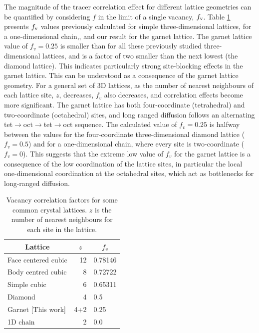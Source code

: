 \documentclass[aps,prb,twocolumn,superscriptaddress,reprint]{revtex4-1}
\begin{document}
The magnitude of the tracer correlation effect for different lattice geometries can be quantified by considering $f$ in the limit of a single vacancy, $f_{\mathrm{v}}$. 
Table \ref{tab:vacancy_correlation_factors} presents $f_{\mathrm{v}}$ values previously calculated for simple three-dimensional lattices,\cite{CompaanAndHaven_TransFaradaySoc1956} for a one-dimensional chain,\cite{Mehrer_DiffusionBook}, and our result for the garnet lattice. 
The garnet lattice value of $f_v=0.25$ is smaller than for all these previously studied three-dimensional lattices, and is a factor of two smaller than the next lowest (the diamond lattice). This indicates particularly strong site-blocking effects in the garnet lattice. 
This can be understood as a consequence of the garnet lattice geometry. 
For a general set of 3D lattices, as the number of nearest neighbours of each lattice site, $z$, decreases, $f_v$ also decreases, and correlation effects become more significant.\cite{Friauf_JApplPhys1962}
The garnet lattice has both four-coordinate (tetrahedral) and two-coordinate (octahedral) sites, and long ranged diffusion follows an alternating tet$\to$oct$\to$tet$\to$oct sequence. 
The calculated value of $f_v=0.25$ is halfway between the values for the four-coordinate three-dimensional diamond lattice ($f_v=0.5$) and for a one-dimensional chain, where every site is two-coordinate ($f_v=0$).\cite{Mehrer_DiffusionBook} 
This suggests that the extreme low value of $f_v$ for the garnet lattice is a consequence of the low coordination of the lattice sites, in particular the local one-dimensional coordination at the octahedral sites, which act as bottlenecks for long-ranged diffusion. 

\begin{table}[htb]
   \begin{center}
     \begin{tabular}{lrl} \hline
        \multicolumn{1}{c}{Lattice} & \multicolumn{1}{c}{$z$} & \multicolumn{1}{c}{$f_v$} \\ \hline
        Face centered cubic\cite{CompaanAndHaven_TransFaradaySoc1956} & 12 & 0.78146 \\
        Body centred cubic\cite{CompaanAndHaven_TransFaradaySoc1956} & 8 & 0.72722 \\
        Simple cubic\cite{CompaanAndHaven_TransFaradaySoc1956} & 6 & 0.65311 \\
        Diamond\cite{CompaanAndHaven_TransFaradaySoc1956} & 4 & 0.5 \\
        Garnet [This work] & 4+2 & 0.25 \\ 
        1D chain\cite{Mehrer_DiffusionBook} & 2 & 0.0 \\ \hline
     \end{tabular}
   \caption{\label{tab:vacancy_correlation_factors}Vacancy correlation factors for some common crystal lattices. $z$ is the number of nearest neighbours for each site in the lattice.}
   \end{center}
 \end{table}
\end{document}
